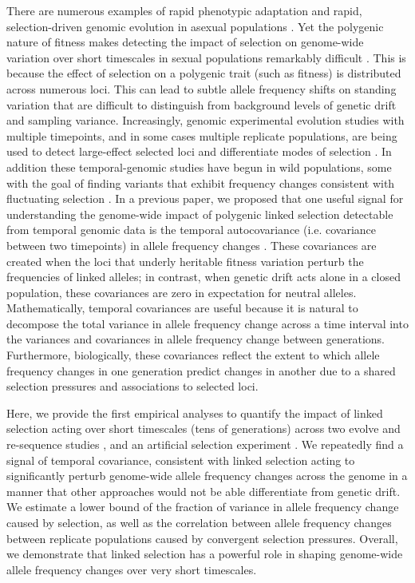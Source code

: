 \documentclass[11pt]{article}
\begin{document}
There are numerous examples of rapid phenotypic adaptation
\parencite{Grant2011-wk,Grant2006-hj,Reznick1997-mh,Franks2007-dr} and rapid,
selection-driven genomic evolution in asexual populations
\parencite{Good2017-om,Bennett1990-bc,Baym2016-kh}.  Yet the polygenic nature
of fitness makes detecting the impact of selection on genome-wide variation
over short timescales in sexual populations remarkably difficult
\parencite{Latta1998-me, Pritchard2010-tk,Kemper2014-bx}. This is because the
effect of selection on a polygenic trait (such as fitness) is distributed
across numerous loci. This can lead to subtle allele frequency shifts on
standing variation that are difficult to distinguish from background levels of
genetic drift and sampling variance. Increasingly, genomic experimental
evolution studies with multiple timepoints, and in some cases multiple
replicate populations, are being used to detect large-effect selected loci
\parencite{Turner2011-sx,Turner2012-bm} and differentiate modes of selection
\parencite{Burke2010-tz,Barghi2019-qy,Therkildsen2019-zy}.  In addition these
temporal-genomic studies have begun in wild populations, some with the goal of
finding variants that exhibit frequency changes consistent with fluctuating
selection \parencite{Bergland2014-ij,Machado2018-cs}. In a previous paper, we
proposed that one useful signal for understanding the genome-wide impact of
polygenic linked selection detectable from temporal genomic data is the
temporal autocovariance (i.e. covariance between two timepoints) in allele
frequency changes \parencite{Buffalo2019-io}.  These covariances are created
when the loci that underly heritable fitness variation perturb the frequencies
of linked alleles; in contrast, when genetic drift acts alone in a closed
population, these covariances are zero in expectation for neutral alleles.
Mathematically, temporal covariances are useful because it is natural to
decompose the total variance in allele frequency change across a time interval
into the variances and covariances in allele frequency change between
generations.  Furthermore, biologically, these covariances reflect the extent
to which allele frequency changes in one generation predict changes in another
due to a shared selection pressures and associations to selected loci.

Here, we provide the first empirical analyses to quantify the impact of linked
selection acting over short timescales (tens of generations) across two evolve
and re-sequence studies \parencite{Barghi2019-qy,Kelly2019-dc}, and an
artificial selection experiment \parencite{Castro2019-uk}. We repeatedly find a
signal of temporal covariance, consistent with linked selection acting to
significantly perturb genome-wide allele frequency changes across the genome in
a manner that other approaches would not be able differentiate from genetic
drift. We estimate a lower bound of the fraction of variance in allele
frequency change caused by selection, as well as the correlation between allele
frequency changes between replicate populations caused by convergent selection
pressures. Overall, we demonstrate that linked selection has a powerful role in
shaping genome-wide allele frequency changes over very short timescales.
\end{document}
